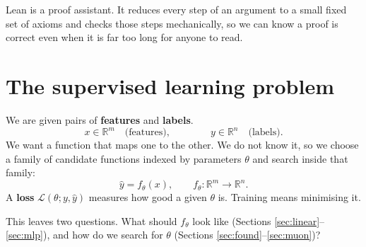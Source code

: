 \documentclass[11pt]{article}
\newcommand{\R}{\mathbb{R}}
\newcommand{\Loss}{\mathcal{L}}
\newcommand{\yhat}{\hat{y}}
\begin{document}
\medskip
\noindent
Lean is a proof assistant. It reduces every step of an argument to a small fixed set of
axioms and checks those steps mechanically, so we can know a proof is correct even when it
is far too long for anyone to read.

\section{The supervised learning problem}

We are given pairs of \textbf{features} and \textbf{labels}.
%
\[
  x \in \R^{m} \quad\text{(features)},
  \qquad\qquad
  y \in \R^{n} \quad\text{(labels)}.
\]
%
We want a function that maps one to the other. We do not know it, so we choose a family
of candidate functions indexed by parameters $\theta$ and search inside that family:
%
\[
  \yhat = f_\theta(x), \qquad f_\theta : \R^m \to \R^n .
\]
%
A \textbf{loss} $\Loss(\theta; y, \yhat)$ measures how good a given $\theta$ is.
Training means minimising it.

\begin{center}
\end{center}

\noindent
This leaves two questions. What should $f_\theta$ look like (Sections
\ref{sec:linear}--\ref{sec:mlp}), and how do we search for $\theta$ (Sections
\ref{sec:found}--\ref{sec:muon})?
\end{document}
